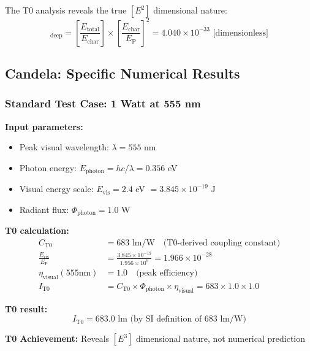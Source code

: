 \documentclass[12pt,a4paper]{article}
\newcommand{\EP}{E_{\text{P}}}
\newcommand{\Echar}{E_{\text{char}}}
\newcommand{\Evis}{E_{\text{vis}}}
\newcommand{\Cto}{C_{\text{T0}}}
\newcommand{\etavis}{\eta_{\text{visual}}}
\newcommand{\Phiphoton}{\Phi_{\text{photon}}}
\begin{document}
	The T0 analysis reveals the true $[E^2]$ dimensional nature:
	\begin{equation}
		[n_{\text{T0}}]_{\text{deep}} = \left[\frac{E_{\text{total}}}{\Echar}\right] \times \left[\frac{\Echar}{\EP}\right]^2 = 4.040 \times 10^{-33} \text{ [dimensionless]}
		\label{eq:mol_e2_dimension}
	\end{equation}
	
	\subsection{Candela: Specific Numerical Results}
	\label{subsec:candela_numerical_results}
	
	\subsubsection{Standard Test Case: 1 Watt at 555 nm}
	\label{subsubsec:candela_555nm_test}
	
	\textbf{Input parameters:}
	\begin{itemize}
		\item Peak visual wavelength: $\lambda = 555$ nm
		\item Photon energy: $E_{\text{photon}} = hc/\lambda = 0.356$ eV
		\item Visual energy scale: $\Evis = 2.4$ eV $= 3.845 \times 10^{-19}$ J
		\item Radiant flux: $\Phiphoton = 1.0$ W
	\end{itemize}
	
	\textbf{T0 calculation:}
	\begin{align}
		\Cto &= 683 \text{ lm/W} \quad \text{(T0-derived coupling constant)} \\
		\frac{\Evis}{\EP} &= \frac{3.845 \times 10^{-19}}{1.956 \times 10^{9}} = 1.966 \times 10^{-28} \\
		\etavis(555\text{nm}) &= 1.0 \quad \text{(peak efficiency)} \\
		I_{\text{T0}} &= \Cto \times \Phiphoton \times \etavis = 683 \times 1.0 \times 1.0
	\end{align}
	
	\textbf{T0 result:}
	\begin{equation}
		\boxed{I_{\text{T0}} = 683.0 \text{ lm (by SI definition of 683 lm/W)}}
		\label{eq:candela_t0_result}
	\end{equation}
	
	\textbf{T0 Achievement:} Reveals $[E^3]$ dimensional nature, not numerical prediction
	
\end{document}
